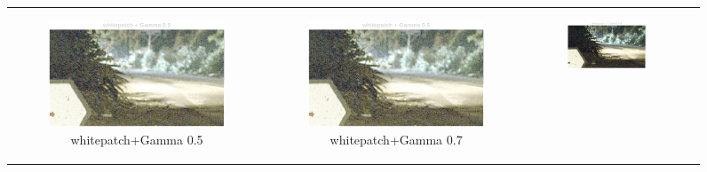 \documentclass[11pt, a4]{article}
\begin{document}
\begin{enumerate}
\begin{enumerate}
\begin{figure}[h]
{\begin{tabular}{cccc}
\begin{subfigure}[h]{0.45\linewidth}
							\includegraphics[width=\linewidth]{../output/RawImage3_Tone_whitepatch_Gamma0.5.pdf}
							\caption{whitepatch+Gamma 0.5}
							\label{fig:RawImage3_tone_6}
						\end{subfigure} &
						\begin{subfigure}[h]{0.45\linewidth}
							\centering
							\includegraphics[width=\linewidth]{../output/RawImage3_Tone_whitepatch_Gamma0.5.pdf}
							\caption{whitepatch+Gamma 0.7}
							\label{fig:RawImage3_tone_7}
						\end{subfigure} &
						\begin{subfigure}[h]{0.45\linewidth}
							\centering
							\includegraphics[width=\linewidth]{../output/RawImage3_Tone_whitepatch_Gamma0.9.pdf}

\end{subfigure}
\end{tabular}}
\end{figure}
\end{enumerate}
\end{enumerate}
\end{document}
